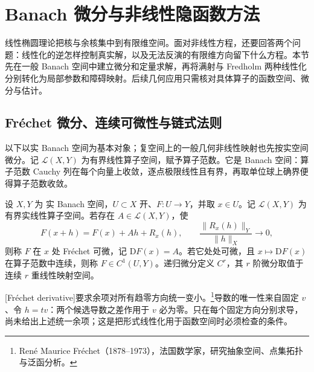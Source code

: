 
% 
% 
% 

\section{Banach 微分与非线性隐函数方法}
\label{g3:sec:1305}

线性椭圆理论把核与余核集中到有限维空间。面对非线性方程，还要回答两个问题：线性化的逆怎样控制真实解，以及无法反演的有限维方向留下什么方程。本节先在一般 Banach 空间中建立微分和定量求解，再将满射与 Fredholm 两种线性化分别转化为局部参数和障碍映射。后续几何应用只需核对具体算子的函数空间、微分与估计。

\subsection{Fréchet 微分、连续可微性与链式法则}
\label{g3:subsec:1305:01}
以下以实 Banach 空间为基本对象；复空间上的一般几何非线性映射也先按实空间微分。记 \(\mathcal L(X,Y)\) 为有界线性算子空间，赋予算子范数。它是 Banach 空间：算子范数 Cauchy 列在每个向量上收敛，逐点极限线性且有界，再取单位球上确界便得算子范数收敛。

\begin{definition}\label{g3:def:frechet-derivative}
	设 \(X,Y\) 为 实 Banach 空间，\(U\subset X\) 开、\(F:U\to Y\)，并取 \(x\in U\)。记 \(\mathcal L(X,Y)\) 为有界实线性算子空间。若存在 \(A\in\mathcal L(X,Y)\)，使
	\[
		F(x+h)=F(x)+Ah+R_x(h),\qquad
		\frac{\|R_x(h)\|_Y}{\|h\|_X}\longrightarrow0,
	\]
	则称 \(F\) 在 \(x\) 处 Fréchet 可微，记 \(\mathrm DF(x)=A\)。若它处处可微，且 \(x\mapsto\mathrm DF(x)\) 在算子范数中连续，则称 \(F\in C^1(U,Y)\)。递归微分定义 \(C^r\)，其 \(r\) 阶微分取值于连续 \(r\) 重线性映射空间。
\end{definition}
[Fréchet derivative]要求余项对所有趋零方向统一变小。\footnote{René Maurice Fréchet（1878--1973），法国数学家，研究抽象空间、点集拓扑与泛函分析。}导数的唯一性来自固定 \(v\)、令 \(h=tv\)：两个候选导数之差作用于 \(v\) 必为零。只在每个固定方向分别求导，尚未给出上述统一余项；这是把形式线性化用于函数空间时必须检查的条件。

